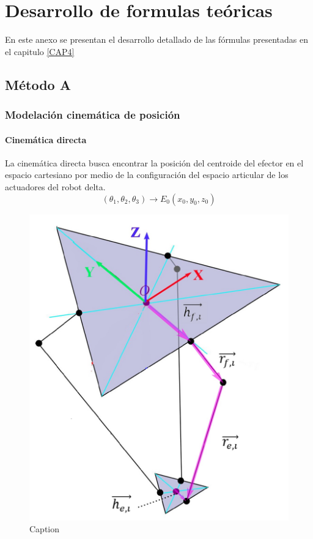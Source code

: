 \chapter{Desarrollo de formulas teóricas}\label{anexoB}
\thispagestyle{fancy}
    En este anexo se presentan el desarrollo detallado de las fórmulas presentadas en el capitulo \ref{CAP4} 
    
    
\section{Método A}
    \subsection{Modelación cinemática de posición}
        \subsubsection{Cinemática directa}
        
        La cinemática directa busca encontrar la posición del centroide del efector en el espacio cartesiano por medio de la configuración del espacio articular de los actuadores del robot delta.
        \begin{equation*}
             \left(  \theta _{1}, \theta _{2}, \theta _{3} \right)   \rightarrow E_{0} \left( x_{0},y_{0},z_{0} \right)            
        \end{equation*}

        \begin{figure}[htb]
            \centering
            \includegraphics[width=0.45\linewidth]{Main/Chapter4/Images4/DIBUJO10.jpg}
            \caption{Caption}
            \label{fig:ANEXO_MA_C_POS_1}
        \end{figure}

